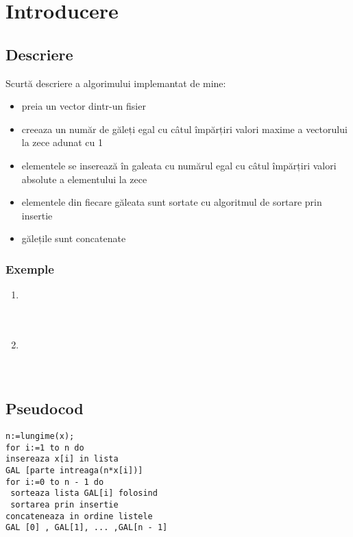\chapter{Introducere}
\section{Descriere}
    \LARGE{Scurtă descriere a algorimului implemantat de mine:}
    \begin{itemize}
        \item \LARGE{preia un vector dintr-un fisier}
        \item \LARGE{creeaza un număr de găleți egal cu câtul împărțiri valori maxime a vectorului la zece adunat cu 1 }
        \item \LARGE{elementele se inserează în galeata cu numărul egal cu câtul împărțiri valori absolute a elementului la zece}
        \item \LARGE{elementele din fiecare găleata sunt sortate cu algoritmul de sortare prin insertie}
        \item \LARGE{gălețile sunt concatenate}
    \end{itemize}


\subsection{Exemple}
\begin{enumerate}
    \item {
           \\
      \\
      \\
    }
    \vskip 0.5cm
    \item {
             \\
       \\
       \\
    } 
\end{enumerate}

\vskip 0.5cm

\section{Pseudocod}
\begin{lstlisting}
n:=lungime(x);
for i:=1 to n do
insereaza x[i] in lista 
GAL [parte intreaga(n*x[i])]
for i:=0 to n - 1 do
 sorteaza lista GAL[i] folosind
 sortarea prin insertie
concateneaza in ordine listele 
GAL [0] , GAL[1], ... ,GAL[n - 1]
\end{lstlisting}